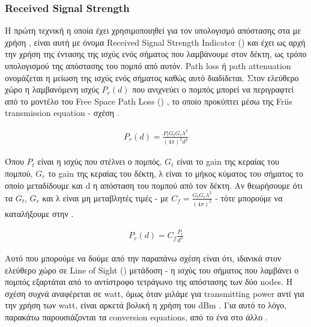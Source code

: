 \subsubsection{Received Signal Strength}
Η πρώτη τεχνική η οποία έχει χρησιμοποιηθεί για τον υπολογισμό απόστασης στα 
 με χρήση , είναι αυτή με όνομα Received Signal Strength Indicator
() και έχει ως αρχή την χρήση της έντασης της ισχύς ενός 
σήματος που λαμβάνουμε στον δέκτη, ως τρόπο υπολογισμού της απόστασης
του πομπό από αυτόν. Path loss ή path attenuation \cite{wikipedia-Path_loss} ονομάζεται η μείωση της ισχύς
ενός σήματος καθώς αυτό διαδίδεται.
Στον ελεύθερο χώρο η λαμβανόμενη ισχύς $P_r(d)$ που ανιχνεύει ο πομπός
μπορεί να περιγραφτεί από το μοντέλο του Free Space Path Loss () \cite{wikipedia-fspl}, το οποίο προκύπτει
μέσω της Friis transmission equation \cite{wsn-Localization-techniques} \cite{rssi-wlan} \cite{wikipedia-friis-equation} - σχέση .

\begin{align}
	P_r(d)=\frac{P_tG_tG_r\lambda^2}{(4\pi)^2d^2} \label{eq:signal-strength}
\end{align}

Όπου $P_t$ είναι η ισχύς που στέλνει ο πομπός, $G_t$ είναι το gain της κεραίας του
πομπού, $G_r$ το gain της κεραίας του δέκτη, λ είναι το μήκος κύματος του σήματος
το οποίο μεταδίδουμε και d η απόσταση του πομπού από τον δέκτη. Αν θεωρήσουμε ότι 
τα $G_t$, $G_r$ και λ είναι μη μεταβλητές τιμές - με $C_f = \frac{G_tG_r\lambda^2}{(4\pi)^2}$ - τότε μπορούμε να καταλήξουμε
στην  \cite{rssi-simple-formula}.

\begin{align}
	P_r(d)=C_f\frac{P_t}{d^2} \label{eq:signal-strength-simple}
\end{align}

Αυτό που μπορούμε να δούμε από την παραπάνω σχέση είναι ότι, ιδανικά στον ελεύθερο 
χώρο σε Line of Sight () μετάδοση -
η ισχύς του σήματος που λαμβάνει ο πομπός εξαρτάται από το αντίστροφο τετράγωνο της
απόστασης των δύο nodes. Η σχέση  συχνά αναφέρεται σε watt, 
όμως όταν μιλάμε για transmitting power αντί για την χρήση των watt, είναι αρκετά βολική
η χρήση του dBm \cite{wikipedia-dBm}. Για αυτό το λόγο, παρακάτω παρουσιάζονται τα conversion
equations, από το ένα στο άλλο \cite{rssi-wlan} \cite{wikipedia-dBm}. 

